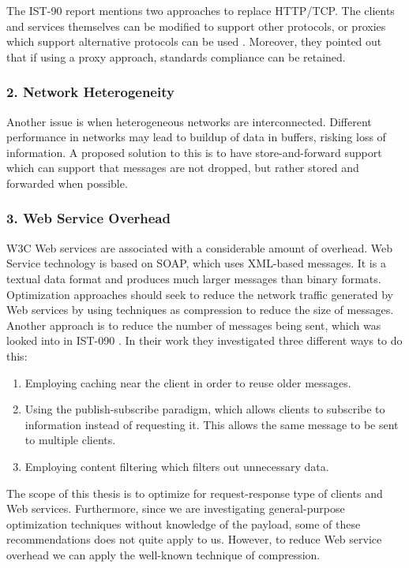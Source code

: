 The IST-90 report mentions two approaches to replace HTTP/TCP. The clients and
services themselves can be modified to support other protocols, or proxies
which support alternative protocols can be used \cite{ist-090}. Moreover, they
pointed out that if using a proxy approach, standards compliance can be
retained.


\subsubsection{2. Network Heterogeneity}

Another issue is when heterogeneous networks are interconnected. Different
performance in networks may lead to buildup of data in buffers, risking loss of
information. A proposed solution to this is to have store-and-forward support
which can support that messages are not dropped, but rather stored and forwarded when
possible.


\subsubsection{3. Web Service Overhead}

W3C Web services are associated with a considerable amount of overhead. Web
Service technology is based on SOAP, which uses XML-based messages. It is a
textual data format and produces much larger messages than binary formats.
Optimization approaches should seek to reduce the network traffic generated by
Web services by using techniques as compression to reduce the size of messages.
Another approach is to reduce the number of messages being sent, which was
looked into in IST-090 \cite{ist-090}. In their work they investigated three
different ways to do this:

\begin{enumerate}
    \item Employing caching near the client in order to reuse older messages.
    \item Using the publish-subscribe paradigm, which allows clients to subscribe to
    information instead of requesting it. This allows the same message to be sent
    to multiple clients.
    \item Employing content filtering which filters out unnecessary data.
\end{enumerate}

The scope of this thesis is to optimize for request-response type of clients and
Web services. Furthermore, since we are investigating general-purpose
optimization techniques without knowledge of the payload, some of these
recommendations does not quite apply to us. However, to reduce Web service
overhead we can apply the well-known technique of compression.

